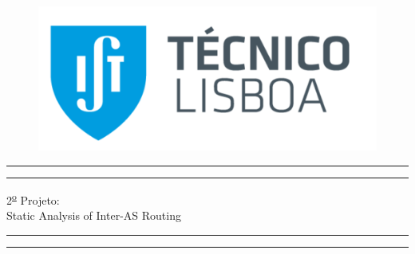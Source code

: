 \documentclass[twocolumn]{article} %
\begin{document}
 

\begin{titlepage} %

	\begin{figure}[t]
	\graphicspath{ {../../} }
	\includegraphics[width = 8 cm]{logo.png}
	\centering
	\end{figure}
	
	\centering %
	
	\scshape %
	
	\vspace*{\baselineskip} %
	
	
	\rule{\textwidth}{1.6pt}\vspace*{-\baselineskip}\vspace*{2pt} %
	\rule{\textwidth}{0.4pt} %
	
	\vspace{0.75\baselineskip} %
	
	{\LARGE 2\textsuperscript{\underline{o}} Projeto:\\Static Analysis of Inter-AS Routing\par} %
	
	\vspace{0.75\baselineskip} %
	
	\rule{\textwidth}{0.4pt}\vspace*{-\baselineskip}\vspace{3.2pt} %
	\rule{\textwidth}{1.6pt} %
	
	\vspace{2\baselineskip} %
	
	

\end{titlepage}
\end{document}
